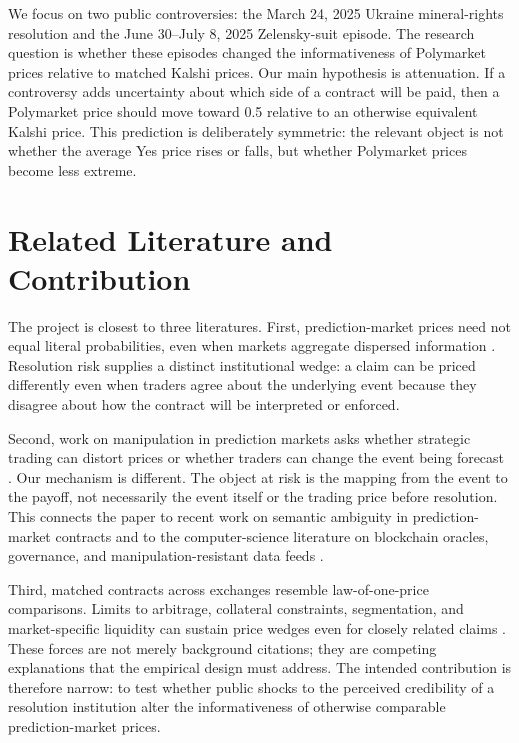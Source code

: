 \documentclass[11pt]{article}
\begin{document}
We focus on two public controversies: the March 24, 2025 Ukraine mineral-rights resolution
and the June 30--July 8, 2025 Zelensky-suit episode. The research question is whether these
episodes changed the informativeness of Polymarket prices relative to matched Kalshi prices.
Our main hypothesis is attenuation. If a controversy adds uncertainty about which side of a
contract will be paid, then a Polymarket price should move toward 0.5 relative to an otherwise
equivalent Kalshi price. This prediction is deliberately symmetric: the relevant object is
not whether the average Yes price rises or falls, but whether Polymarket prices become less
extreme.

\section{Related Literature and Contribution}

The project is closest to three literatures. First, prediction-market prices need not equal
literal probabilities, even when markets aggregate dispersed information
\citep{wolfers2004,manski2006,wolfers2006}. Resolution risk supplies a distinct institutional
wedge: a claim can be priced differently even when traders agree about the underlying event
because they disagree about how the contract will be interpreted or enforced.

Second, work on manipulation in prediction markets asks whether strategic trading can
distort prices or whether traders can change the event being forecast
\citep{hanson2006,ottaviani2007,rhode2008}. Our mechanism is different. The object at risk is
the mapping from the event to the payoff, not necessarily the event itself or the trading
price before resolution. This connects the paper to recent work on semantic ambiguity in
prediction-market contracts \citep{fisman2026} and to the computer-science literature on
blockchain oracles, governance, and manipulation-resistant data feeds
\citep{eskandari2021}.

Third, matched contracts across exchanges resemble law-of-one-price comparisons. Limits to
arbitrage, collateral constraints, segmentation, and market-specific liquidity can sustain
price wedges even for closely related claims \citep{shleifer1997,froot1999,garleanu2011}.
These forces are not merely background citations; they are competing explanations that the
empirical design must address. The intended contribution is therefore narrow: to test
whether public shocks to the perceived credibility of a resolution institution alter the
informativeness of otherwise comparable prediction-market prices.
\end{document}

